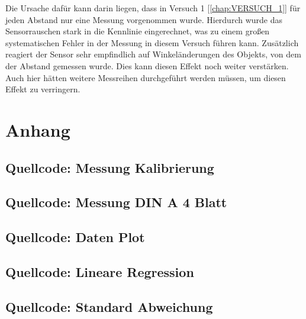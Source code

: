 \documentclass[12pt,oneside,a4paper]{report}
\begin{document}
Die Ursache dafür kann darin liegen, dass in Versuch 1 [\ref{chap:VERSUCH_1}] für jeden Abstand nur eine Messung vorgenommen wurde. Hierdurch wurde das Sensorrauschen stark in die Kennlinie eingerechnet, was zu einem großen systematischen Fehler in der Messung in diesem Versuch führen kann. Zusätzlich reagiert der Sensor sehr empfindlich auf Winkeländerungen des Objekts, von dem der Abstand gemessen wurde. Dies kann diesen Effekt noch weiter verstärken. Auch hier hätten weitere Messreihen durchgeführt werden müssen, um diesen Effekt zu verringern.


\renewcommand\thesection{A.\arabic{section}}
\renewcommand\thesubsection{\thesection.\arabic{subsection}}


\chapter*{Anhang}
\label{chap:APPENDIX}
\addtocounter{chapter}{1}
\setcounter{section}{0}

\section{Quellcode: Messung Kalibrierung}
\label{chap:APPENDIX_SOURCECODE_MEASURE}


\section{Quellcode: Messung DIN A 4 Blatt}
\label{chap:APPENDIX_SOURCECODE_MEASURE_PAPER}


\section{Quellcode: Daten Plot}
\label{chap:APPENDIX_SOURCECODE_PLOT}


\section{Quellcode: Lineare Regression}
\label{chap:APPENDIX_SOURCECODE_LINEARE_REGRESSION}


\section{Quellcode: Standard Abweichung}
\label{chap:APPENDIX_SOURCECODE_STD_DEVIATION}



\end{document}

